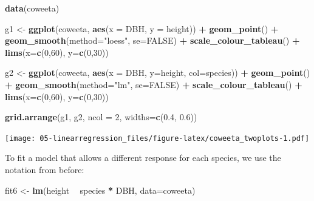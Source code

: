 \documentclass[]{book}
\newenvironment{Shaded}{\begin{snugshade}}{\end{snugshade}}
\newcommand{\DataTypeTok}[1]{\textcolor[rgb]{0.13,0.29,0.53}{#1}}
\newcommand{\DecValTok}[1]{\textcolor[rgb]{0.00,0.00,0.81}{#1}}
\newcommand{\FloatTok}[1]{\textcolor[rgb]{0.00,0.00,0.81}{#1}}
\newcommand{\KeywordTok}[1]{\textcolor[rgb]{0.13,0.29,0.53}{\textbf{#1}}}
\newcommand{\NormalTok}[1]{#1}
\newcommand{\OperatorTok}[1]{\textcolor[rgb]{0.81,0.36,0.00}{\textbf{#1}}}
\newcommand{\OtherTok}[1]{\textcolor[rgb]{0.56,0.35,0.01}{#1}}
\newcommand{\StringTok}[1]{\textcolor[rgb]{0.31,0.60,0.02}{#1}}
\begin{document}
\begin{Shaded}
\begin{Highlighting}[]
\KeywordTok{data}\NormalTok{(coweeta)}

\NormalTok{g1 <-}\StringTok{ }\KeywordTok{ggplot}\NormalTok{(coweeta, }\KeywordTok{aes}\NormalTok{(}\DataTypeTok{x =}\NormalTok{ DBH, }\DataTypeTok{y =}\NormalTok{ height)) }\OperatorTok{+}
\StringTok{  }\KeywordTok{geom_point}\NormalTok{() }\OperatorTok{+}\StringTok{ }\KeywordTok{geom_smooth}\NormalTok{(}\DataTypeTok{method=}\StringTok{"loess"}\NormalTok{, }\DataTypeTok{se=}\OtherTok{FALSE}\NormalTok{) }\OperatorTok{+}
\StringTok{  }\KeywordTok{scale_colour_tableau}\NormalTok{() }\OperatorTok{+}\StringTok{ }\KeywordTok{lims}\NormalTok{(}\DataTypeTok{x=}\KeywordTok{c}\NormalTok{(}\DecValTok{0}\NormalTok{,}\DecValTok{60}\NormalTok{), }\DataTypeTok{y=}\KeywordTok{c}\NormalTok{(}\DecValTok{0}\NormalTok{,}\DecValTok{30}\NormalTok{))}

\NormalTok{g2 <-}\StringTok{ }\KeywordTok{ggplot}\NormalTok{(coweeta, }\KeywordTok{aes}\NormalTok{(}\DataTypeTok{x =}\NormalTok{ DBH, }\DataTypeTok{y=}\NormalTok{height, }\DataTypeTok{col=}\NormalTok{species)) }\OperatorTok{+}
\StringTok{  }\KeywordTok{geom_point}\NormalTok{() }\OperatorTok{+}\StringTok{ }\KeywordTok{geom_smooth}\NormalTok{(}\DataTypeTok{method=}\StringTok{"lm"}\NormalTok{, }\DataTypeTok{se=}\OtherTok{FALSE}\NormalTok{) }\OperatorTok{+}
\StringTok{  }\KeywordTok{scale_colour_tableau}\NormalTok{() }\OperatorTok{+}\StringTok{ }\KeywordTok{lims}\NormalTok{(}\DataTypeTok{x=}\KeywordTok{c}\NormalTok{(}\DecValTok{0}\NormalTok{,}\DecValTok{60}\NormalTok{), }\DataTypeTok{y=}\KeywordTok{c}\NormalTok{(}\DecValTok{0}\NormalTok{,}\DecValTok{30}\NormalTok{))}

\KeywordTok{grid.arrange}\NormalTok{(g1, g2, }\DataTypeTok{ncol =} \DecValTok{2}\NormalTok{, }\DataTypeTok{widths=}\KeywordTok{c}\NormalTok{(}\FloatTok{0.4}\NormalTok{, }\FloatTok{0.6}\NormalTok{))}
\end{Highlighting}
\end{Shaded}

\texttt{[image: 05-linearregression\_files/figure-latex/coweeta\_twoplots-1.pdf]}

To fit a model that allows a different response for each species, we use the notation from before:

\begin{Shaded}
\begin{Highlighting}[]
\NormalTok{fit6 <-}\StringTok{ }\KeywordTok{lm}\NormalTok{(height }\OperatorTok{~}\StringTok{ }\NormalTok{species }\OperatorTok{*}\StringTok{ }\NormalTok{DBH, }\DataTypeTok{data=}\NormalTok{coweeta)}
\end{Highlighting}
\end{Shaded}
\end{document}
